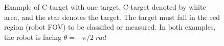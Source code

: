 \documentclass[12pt,draftcls,onecolumn]{IEEEtran}
\begin{document}
\begin{figure}[htp]
  \centering
  \quad
  \caption{Example of C-target with one target. C-target denoted by white area, and the star denotes the target. The target must fall in the red region (robot FOV) to be classified or measured. In both examples, the robot is facing $\theta = -\pi/2 \; rad$}
  \label{fig:4}
\end{figure}
\end{document}
